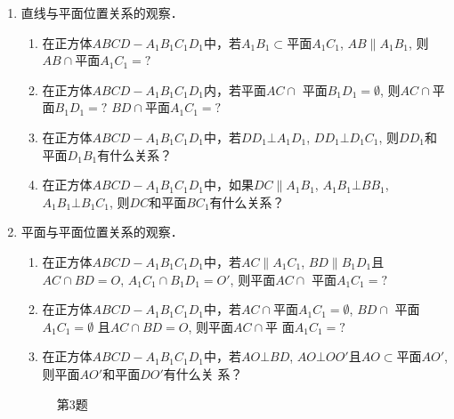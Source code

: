 \begin{enumerate}
\item 直线与平面位置关系的观察．
\begin{enumerate}
  \item 在正方体$ABCD-A_1B_1C_1D_1$中，若$A_1B_1\subset$平面$A_1C_1$, 
  $AB\parallel A_1B_1$, 则$AB\cap $平面$A_1C_1=?$
  \item 在正方体$ABCD-A_1B_1C_1D_1$内，若平面$AC\cap $
  平面$B_1D_1=\emptyset$, 则$AC\cap $平面$B_1D_1=?$ $BD\cap $平面$A_1C_1=?$
  \item 在正方体$ABCD-A_1B_1C_1D_1$中，若$DD_1\bot A_1D_1$, 
  $DD_1\bot D_1C_1$, 则$DD_1$和平面$D_1B_1$有什么关系？
  \item 在正方体$ABCD-A_1B_1C_1D_1$中，如果$DC\parallel A_1B_1$, 
  $A_1B_1\bot BB_1$, $A_1B_1\bot B_1C_1$, 则$DC$和平面$BC_1$有什么关系？
\end{enumerate}

\item 平面与平面位置关系的观察．
\begin{enumerate}
  \item 在正方体$ABCD-A_1B_1C_1D_1$中，若$AC\parallel A_1C_1$, 
  $BD\parallel B_1D_1$且$AC\cap BD=O$, $A_1C_1\cap B_1D_1=O'$, 则平面$AC\cap$
  平面$A_1C_1=?$
  \item 在正方体$ABCD-A_1B_1C_1D_1$中，若$AC\cap$平面$A_1C_1
  =\emptyset$, $BD\cap $ 平面$A_1C_1=\emptyset$ 且$AC\cap BD=O$, 则平面$AC\cap $平
  面$A_1C_1=?$
  \item 在正方体$ABCD-A_1B_1C_1D_1$中，若$AO\bot BD$, $AO\bot 
  OO'$且$AO\subset $平面$AO'$, 则平面$AO'$和平面$DO'$有什么关
  系？
\end{enumerate}

\begin{figure}[htp]
  \centering
  \caption*{第3题}
\end{figure}

\end{enumerate}

